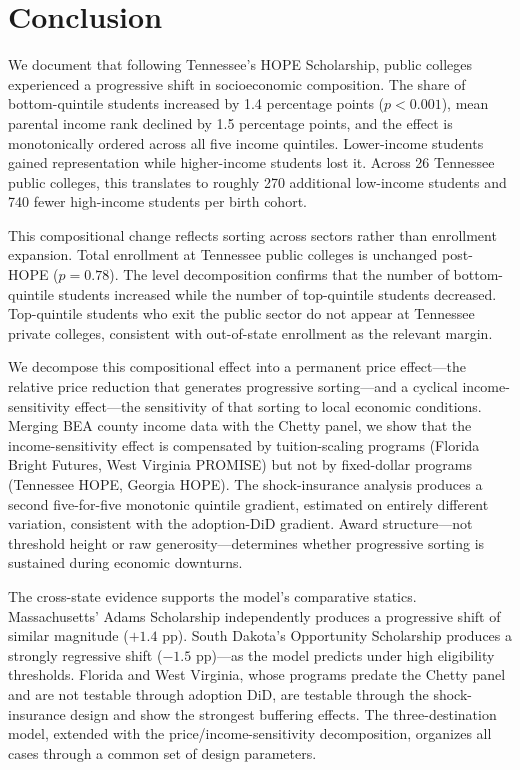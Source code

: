 
\section{Conclusion}
\label{sec:conclusion}

We document that following Tennessee's HOPE Scholarship, public colleges
experienced a progressive shift in socioeconomic composition. The share
of bottom-quintile students increased by 1.4 percentage points
($p < 0.001$), mean parental income rank declined by 1.5 percentage
points, and the effect is monotonically ordered across all five income
quintiles. Lower-income students gained representation while
higher-income students lost it. Across 26 Tennessee public colleges,
this translates to roughly 270 additional low-income students and 740
fewer high-income students per birth cohort.

This compositional change reflects sorting across sectors rather than
enrollment expansion. Total enrollment at Tennessee public colleges is
unchanged post-HOPE ($p = 0.78$). The level decomposition confirms
that the number of bottom-quintile students increased while the number
of top-quintile students decreased. Top-quintile students who exit the
public sector do not appear at Tennessee private colleges, consistent
with out-of-state enrollment as the relevant margin.

We decompose this compositional effect into a permanent price
effect---the relative price reduction that generates progressive
sorting---and a cyclical income-sensitivity effect---the sensitivity
of that sorting to local economic conditions. Merging BEA county income
data with the Chetty panel, we show that the income-sensitivity effect
is compensated by tuition-scaling programs (Florida Bright Futures,
West Virginia PROMISE) but not by fixed-dollar programs (Tennessee
HOPE, Georgia HOPE). The shock-insurance analysis produces a second
five-for-five monotonic quintile gradient, estimated on entirely
different variation, consistent with the adoption-DiD gradient. Award
structure---not threshold height or raw generosity---determines whether
progressive sorting is sustained during economic downturns.

The cross-state evidence supports the model's comparative statics.
Massachusetts' Adams Scholarship independently produces a progressive
shift of similar magnitude ($+1.4$ pp). South Dakota's Opportunity
Scholarship produces a strongly regressive shift ($-1.5$ pp)---as the
model predicts under high eligibility thresholds. Florida and West
Virginia, whose programs predate the Chetty panel and are not testable
through adoption DiD, are testable through the shock-insurance design
and show the strongest buffering effects. The three-destination model,
extended with the price/income-sensitivity decomposition, organizes all
cases through a common set of design parameters.

